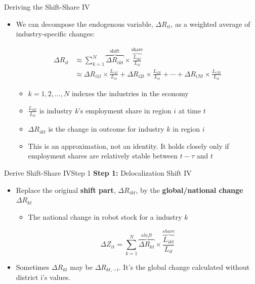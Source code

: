 \documentclass[dvipsnames,hyperref={pdfpagelabels=false}]{beamer}
\begin{document}
\begin{frame}{Deriving the Shift-Share IV} 
	\begin{itemize}
		\item We can decompose the endogenous variable, $\Delta R_{it}$, as a weighted average of industry-specific changes:
		
		\begin{align*}
			\Delta R_{it} &\approx\sum_{k=1}^{N} \overbrace{\Delta R_{ikt}}^{\text{shift}} \times \overbrace{\frac{L_{ikt}}{L_{it}}}^{\text{share}} \\
			&\approx \Delta R_{i1t} \times \frac{L_{i1t}}{L_{it}} + \Delta R_{i2t} \times \frac{L_{i2t}}{L_{it}} + \cdots + \Delta R_{iNt} \times \frac{L_{iNt}}{L_{it}}
		\end{align*}
		
		\begin{itemize}
			\item $k = 1,2,\ldots,N$ indexes the industries in the economy
			\vspace{0.2cm}
			\item $\frac{L_{ikt}}{L_{it}}$ is industry $k$'s employment share in region $i$ at time $t$ 
			\vspace{0.2cm}
			\item $\Delta R_{ikt}$ is the change in outcome for industry $k$ in region $i$ 
			\vspace{0.2cm}
			\item This is an approximation, not an identity. It holds closely only if employment shares are relatively stable between $t-\tau$ and $t$
		\end{itemize}
	\end{itemize}
\end{frame}


\begin{frame}{Derive Shift-Share IV}{Step 1}
	\textbf{Step 1:} Delocalization Shift IV
							\vspace{0.2cm}
	\begin{itemize}
		\item Replace the original \textbf{shift part}, $\Delta R_{ikt}$, by the \textbf{global/national change} $\Delta R_{kt}$ 
			\begin{itemize}
									\vspace{0.2cm}
		\item The national change in robot stock for a industry $k$
			\end{itemize}

	\[ \Delta Z_{it}=\sum_{k=1}^{N} \overbrace{\Delta R_{kt}}^{shift} \times  \overbrace{\frac{L_{ikt}}{L_{it}}}^{share} \]


\item Sometimes $\Delta R_{kt}$ may be $\Delta R_{kt,-i}$. It's the global change calculated without district i's values.
	\end{itemize}

\end{frame}
\end{document}
